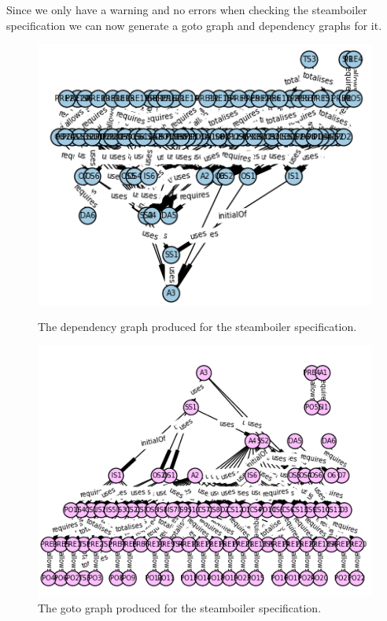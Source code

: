 Since we only have a warning and no errors when checking the steamboiler
specification we can now generate a goto graph and dependency graphs for it.

\begin{figure}[H]
\centering
\begin{minipage}{0.45\textwidth}
\centering
\includegraphics[trim=4cm 1cm 1cm 1cm, scale=0.5]{examples/steamboiler/25a.png}
\caption{The dependency graph produced for the steamboiler specification. \label{fig:steamdepgraph}}
\end{minipage}\hfill
\begin{minipage}{0.43\textwidth}
\centering
\includegraphics[trim=4cm 1cm 1cm 1cm, scale=0.5]{examples/steamboiler/25b.png}
\caption{The goto graph produced for the steamboiler specification. \label{fig:steamgotograph}}
\end{minipage}
\end{figure}

